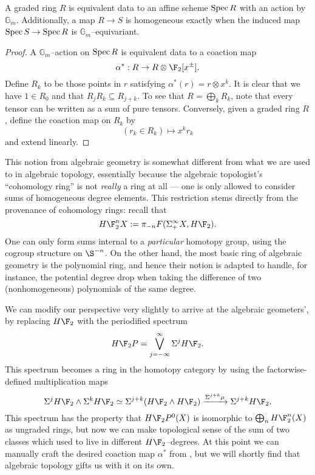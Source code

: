 \begin{lemma}\label{GradedAndGmEquivAgree}
A graded ring $R$ is equivalent data to an affine scheme $\operatorname{Spec} R$ with an action by $\mathbb G_m$.  Additionally, a map $R \to S$ is homogeneous exactly when the induced map $\operatorname{Spec} S \to \operatorname{Spec} R$ is $\mathbb G_m$--equivariant.
\end{lemma}
\begin{proof}
A $\mathbb G_m$--action on $\operatorname{Spec} R$ is equivalent data to a coaction map \[\alpha^*: R \to R \otimes \F_2[x^\pm].\]  Define $R_k$ to be those points in $r$ satisfying $\alpha^*(r) = r \otimes x^k$.  It is clear that we have $1 \in R_0$ and that $R_j R_k \subseteq R_{j+k}$.  To see that $R = \bigoplus_k R_k$, note that every tensor can be written as a sum of pure tensors.  Conversely, given a graded ring $R$, define the coaction map on $R_k$ by \[(r_k \in R_k) \mapsto x^k r_k\] and extend linearly.
\end{proof}

This notion from algebraic geometry is somewhat different from what we are used to in algebraic topology, essentially because the algebraic topologist's ``cohomology ring'' is not \emph{really} a ring at all --- one is only allowed to consider sums of homogeneous degree elements.  This restriction stems directly from the provenance of cohomology rings: recall that \[H\F_2^n X := \pi_{-n} F(\Susp^\infty_+ X, H\F_2).\]  One can only form sums internal to a \emph{particular} homotopy group, using the cogroup structure on $\S^{-n}$.  On the other hand, the most basic ring of algebraic geometry is the polynomial ring, and hence their notion is adapted to handle, for instance, the potential degree drop when taking the difference of two (nonhomogeneous) polynomials of the same degree.

We can modify our perspective very slightly to arrive at the algebraic geometers', by replacing $H\F_2$ with the periodified spectrum \[H\F_2P = \bigvee_{j=-\infty}^\infty \Susp^j H\F_2.\]  This spectrum becomes a ring in the homotopy category by using the factorwise-defined multiplication maps \[\Susp^j H\F_2 \sm \Susp^k H\F_2 \simeq \Susp^{j+k} (H\F_2 \sm H\F_2) \xrightarrow{\Susp^{j+k} \mu} \Susp^{j+k} H\F_2.\]  This spectrum has the property that $H\F_2P^0(X)$ is isomorphic to $\bigoplus_n H\F_2^n(X)$ as ungraded rings, but now we can make topological sense of the sum of two classes which used to live in different $H\F_2$--degrees.  At this point we can manually craft the desired coaction map $\alpha^*$ from , but we will shortly find that algebraic topology gifts us with it on its own.

